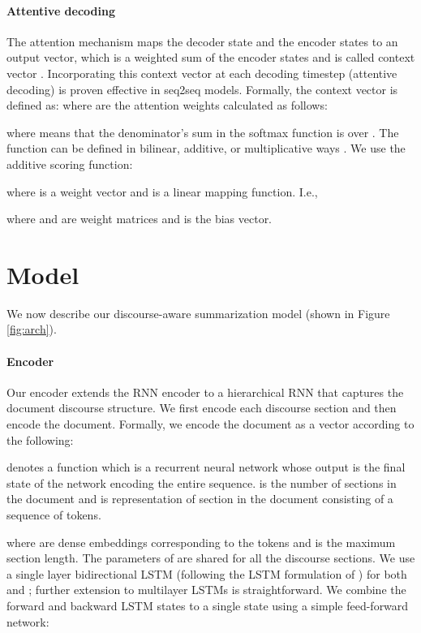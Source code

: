 \documentclass[11pt,a4paper]{article}
\begin{document}
\paragraph{Attentive decoding}

The attention mechanism maps the decoder state and the encoder states to an output vector, which is a weighted sum of the encoder states and is called context vector \cite{bahdanau2014neural}. Incorporating this context vector at each decoding timestep (attentive decoding) is proven effective in seq2seq models.
Formally, the context vector  is defined as: 
where  are the attention weights calculated as follows:


\noindent where {\small} means that the denominator's sum in the softmax function is over . The  function can be defined in bilinear, additive, or multiplicative ways \cite{luong2015effective}. We use the additive scoring function:

\noindent where  is a weight vector and  is a linear mapping function. I.e.,

\noindent where  and  are weight matrices and  is the bias vector.


\section{Model}


We now describe our discourse-aware summarization model (shown in Figure \ref{fig:arch}).

\paragraph{Encoder}

Our encoder extends the RNN encoder to a hierarchical RNN that captures the document discourse structure. We first encode each discourse section and then encode the document. Formally, we encode the document as a vector  according to the following:


\noindent  denotes a function which is a recurrent neural network whose output is the final state of the network encoding the entire sequence.  is the number of sections in the document and  is representation of section  in the document consisting of a sequence of tokens.


\noindent where  are dense embeddings corresponding to the tokens  and  is the maximum section length. The parameters of  are shared for all the discourse sections. We use a single layer bidirectional LSTM (following the LSTM formulation of ) for both  and ; further extension to multilayer LSTMs is straightforward. We combine the forward and backward LSTM states to a single state using a simple feed-forward network:
\end{document}
